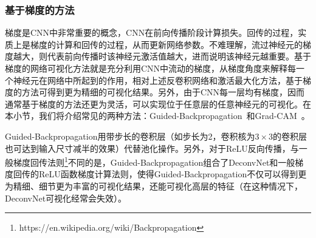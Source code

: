 \subsubsection{基于梯度的方法}
梯度是CNN中非常重要的概念，CNN在前向传播阶段计算损失。回传的过程，实质上是梯度的计算和回传的过程，从而更新网络参数。不难理解，流过神经元的梯度越大，则代表前向传播时该神经元激活值越大，进而说明该神经元越重要。基于梯度的网络可视化方法就是充分利用CNN中流动的梯度，从梯度角度来解释每一个神经元在网络中所起到的作用，相对上述反卷积网络和激活最大化方法，基于梯度的方法可得到更为精细的可视化结果。另外，由于CNN每一层均有梯度，因而通常基于梯度的方法还更为灵活，可以实现位于任意层的任意神经元的可视化。在本小节，我们将介绍常见的两种方法：Guided-Backpropagation~\cite{springenberg2014striving}和Grad-CAM~\cite{selvaraju2017grad}。

Guided-Backpropagation用带步长的卷积层（如步长为2，卷积核为$3\times 3$的卷积层也可达到输入尺寸减半的效果）代替池化操作。另外，对于ReLU反向传播，与一般梯度回传法则\footnote{https://en.wikipedia.org/wiki/Backpropagation}不同的是，Guided-Backpropagation组合了DeconvNet和一般梯度回传的ReLU函数梯度计算法则，使得Guided-Backpropagation不仅可以得到更为精细、细节更为丰富的可视化结果，还能可视化高层的特征（在这种情况下，DeconvNet可视化经常会失效）。

